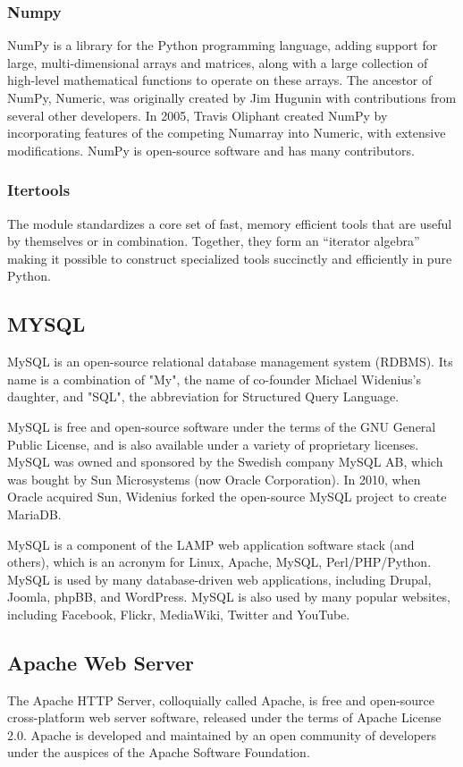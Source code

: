 \documentclass[12pt]{article}
\begin{document}
\subsubsection{Numpy}
NumPy is a library for the Python programming language, adding support for large, multi-dimensional arrays and matrices, along with a large collection of high-level mathematical functions to operate on these arrays. The ancestor of NumPy, Numeric, was originally created by Jim Hugunin with contributions from several other developers. In 2005, Travis Oliphant created NumPy by incorporating features of the competing Numarray into Numeric, with extensive modifications. NumPy is open-source software and has many contributors.

\subsubsection{Itertools}
The module standardizes a core set of fast, memory efficient tools that are useful by themselves or in combination. Together, they form an “iterator algebra” making it possible to construct specialized tools succinctly and efficiently in pure Python.

\subsection{MYSQL}
MySQL is an open-source relational database management system (RDBMS). Its name is a combination of "My", the name of co-founder Michael Widenius's daughter, and "SQL", the abbreviation for Structured Query Language.

MySQL is free and open-source software under the terms of the GNU General Public License, and is also available under a variety of proprietary licenses. MySQL was owned and sponsored by the Swedish company MySQL AB, which was bought by Sun Microsystems (now Oracle Corporation). In 2010, when Oracle acquired Sun, Widenius forked the open-source MySQL project to create MariaDB.

MySQL is a component of the LAMP web application software stack (and others), which is an acronym for Linux, Apache, MySQL, Perl/PHP/Python. MySQL is used by many database-driven web applications, including Drupal, Joomla, phpBB, and WordPress. MySQL is also used by many popular websites, including Facebook, Flickr, MediaWiki, Twitter and YouTube.

\subsection{Apache Web Server}
The Apache HTTP Server, colloquially called Apache, is free and open-source cross-platform web server software, released under the terms of Apache License 2.0. Apache is developed and maintained by an open community of developers under the auspices of the Apache Software Foundation.
\end{document}
